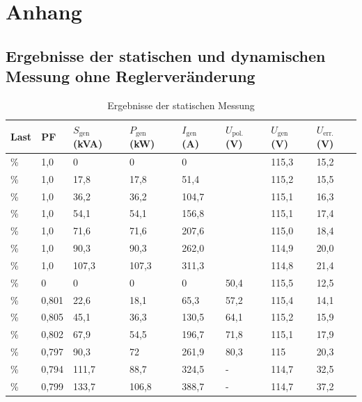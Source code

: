 \chapter{Anhang}
\label{chap:Anhang}
\section{Ergebnisse der statischen und dynamischen Messung ohne Reglerveränderung}\label{sec:MessergebnisseOhneRegleranderung}

\begin{longtable}[]{llllllll}
\caption{Ergebnisse der statischen Messung}
\tabularnewline
\toprule
Last  & PF    & $S_{\mathrm{gen}}$ (kVA) & $P_{\mathrm{gen}}$ (kW) & $I_{\mathrm{gen}}$ (A) & $U_{\mathrm{pol.}}$ (V) & $U_{\mathrm{gen}}$ (V) & $U_{\mathrm{err.}}$ (V) \\ 
\midrule
\endhead
\unit[0]{\%}   & 1,0   & 0          & 0         & 0        &           & 115,3    & 15,2      \\
\unit[25]{\%}  & 1,0   & 17,8       & 17,8      & 51,4     &           & 115,2    & 15,5      \\
\unit[50]{\%}  & 1,0   & 36,2       & 36,2      & 104,7    &           & 115,1    & 16,3      \\
\unit[75]{\%}  & 1,0   & 54,1       & 54,1      & 156,8    &           & 115,1    & 17,4      \\
\unit[100]{\%} & 1,0   & 71,6       & 71,6      & 207,6    &           & 115,0    & 18,4      \\
\unit[125]{\%} & 1,0   & 90,3       & 90,3      & 262,0    &           & 114,9    & 20,0      \\
\unit[150]{\%} & 1,0   & 107,3      & 107,3     & 311,3    &           & 114,8    & 21,4      \\ \midrule
\unit[0]{\%}   & 0     & 0          & 0         & 0        & 50,4      & 115,5    & 12,5      \\
\unit[25]{\%}  & 0,801 & 22,6       & 18,1      & 65,3     & 57,2      & 115,4    & 14,1      \\
\unit[50]{\%}  & 0,805 & 45,1       & 36,3      & 130,5    & 64,1      & 115,2    & 15,9      \\
\unit[75]{\%}  & 0,802 & 67,9       & 54,5      & 196,7    & 71,8      & 115,1    & 17,9      \\
\unit[100]{\%} & 0,797 & 90,3       & 72        & 261,9    & 80,3      & 115      & 20,3      \\
\unit[125]{\%} & 0,794 & 111,7      & 88,7      & 324,5    & -         & 114,7    & 32,5      \\
\unit[150]{\%} & 0,799 & 133,7      & 106,8     & 388,7    & -         & 114,7    & 37,2      \\ \bottomrule
\end{longtable}

